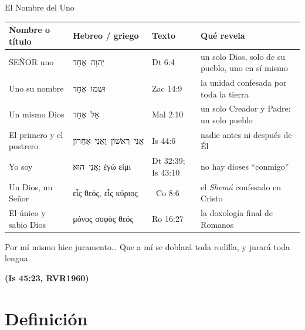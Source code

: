 \documentclass[hyperref={bookmarks=false},aspectratio=169]{beamer}
\newcommand{\heb}[1]{\mbox{\foreignlanguage{hebrew}{#1}}}
\newcommand{\grc}[1]{\foreignlanguage{ancientgreek}{#1}}
\newcommand{\SENOR}{S{\fontsize{0.78em}{1em}\selectfont EÑOR}}
\newcommand{\fuente}[1]{\par\hfill{\upshape\bfseries\footnotesize\textcolor{azul}{#1}}}
\begin{document}
\begin{frame}{El Nombre del Uno}
\scriptsize\renewcommand{\arraystretch}{1.2}
\begin{tabular}{@{}>{\RaggedRight\arraybackslash}p{2.7cm}>{\RaggedRight\arraybackslash}p{3.0cm}>{\RaggedRight\arraybackslash}p{1.8cm}>{\RaggedRight\arraybackslash}p{4.3cm}@{}}
\toprule
\textbf{Nombre o título} & \textbf{Hebreo / griego} & \textbf{Texto} & \textbf{Qué revela} \\ \midrule
\SENOR{} uno & \heb{יְהוָה אֶחָד} & Dt 6:4 & un solo Dios, solo de su pueblo, uno en sí mismo \\
Uno su nombre & \heb{וּשְׁמוֹ אֶחָד} & Zac 14:9 & la unidad confesada por toda la tierra \\
Un mismo Dios & \heb{אֵל אֶחָד} & Mal 2:10 & un solo Creador y Padre: un solo pueblo \\
El primero y el postrero & \heb{אֲנִי רִאשׁוֹן וַאֲנִי אַחֲרוֹן} & Is 44:6 & nadie antes ni después de Él \\
Yo soy & \heb{אֲנִי הוּא}; \grc{ἐγώ εἰμι} & Dt 32:39; Is 43:10 & no hay dioses ``conmigo'' \\
Un Dios, un Señor & \grc{εἷς θεός}, \grc{εἷς κύριος} & 1~Co 8:6 & el \emph{Shemá} confesado en Cristo \\
El único y sabio Dios & \grc{μόνος σοφὸς θεός} & Ro 16:27 & la doxología final de Romanos \\
\bottomrule
\end{tabular}\par\medskip
\begin{cita}Por mí mismo hice juramento\ldots{} Que a mí se doblará toda rodilla, y jurará toda lengua.\fuente{(Is 45:23, RVR1960)}\end{cita}
\end{frame}

\section{Definición}
\end{document}
